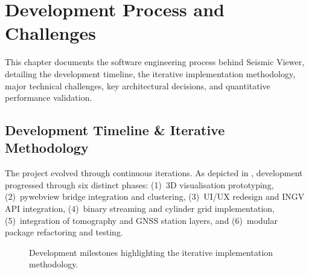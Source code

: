 
\chapter{Development Process and Challenges}
\label{ch:development}

This chapter documents the software engineering process behind Seismic Viewer, detailing the development timeline, the iterative implementation methodology, major technical challenges, key architectural decisions, and quantitative performance validation.

\section{Development Timeline \& Iterative Methodology}
\label{sec:timeline}
\label{sec:methodology}

The project evolved through continuous iterations. As depicted in , development progressed through six distinct phases: (1)~3D visualisation prototyping, (2)~pywebview bridge integration and clustering, (3)~UI/UX redesign and INGV API integration, (4)~binary streaming and cylinder grid implementation, (5)~integration of tomography and GNSS station layers, and (6)~modular package refactoring and testing.

\begin{figure}[htbp]
\centering
{}
\caption{Development milestones highlighting the iterative implementation methodology.}
\label{fig:timeline}
\end{figure}

